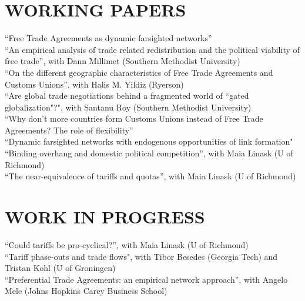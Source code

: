 \documentclass[11pt]{res}
\begin{document}
\begin{resume}
\section{WORKING PAPERS}\vspace{2mm}
{ ``Free Trade Agreements as dynamic farsighted networks''} \vspace{1.5mm}\\
{``An empirical analysis of trade related redistribution and the political viability of free trade''}, with Dann Millimet (Southern Methodist University)\vspace{1.5mm}\\
{``On the different geographic characteristics of Free Trade Agreements and Customs Unions''}, with Halis M. Yildiz (Ryerson)\vspace{1.5mm}\\
``Are global trade negotiations behind a fragmented world of ``gated globalization"?", with Santanu Roy (Southern Methodist University)\vspace{1.5mm}\\
{``Why don't more countries form Customs Unions instead of Free Trade Agreements? The role of flexibility''} \vspace{1.5mm}\\
{``Dynamic farsighted networks with endogenous opportunities of link formation"}\vspace{1.5mm}\\
{``Binding overhang and domestic political competition''}, with Maia Linask (U of Richmond)\vspace{1.5mm}\\
{``The near-equivalence of tariffs and quotas''}, with Maia Linask (U of Richmond)\vspace{1.5mm}\\


\phantom{.}\vspace{.4cm}

\section{WORK IN PROGRESS}\vspace{2mm}
``Could tariffs be pro-cyclical?'', with Maia Linask (U of Richmond)\vspace{1.5mm}\\
``Tariff phase-outs and trade flows", with Tibor Besedes (Georgia Tech) and Tristan Kohl (U of Groningen) \vspace{1.5mm}\\
``Preferential Trade Agreements: an empirical network approach'', with Angelo Mele (Johns Hopkins Carey Business School)\vspace{1.5mm}\\



\end{resume}
\end{document}

